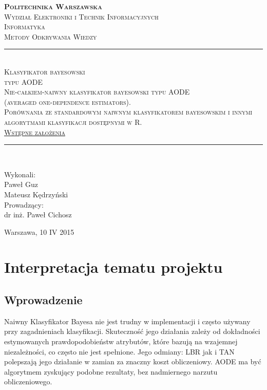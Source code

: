 \documentclass[16]{article}
\begin{document}
	\begin{titlepage}
		\begin{center}
			\vspace*{0cm}
			\textsc{\LARGE \bfseries Politechnika Warszawska}\\[1.5cm]
			\textsc{\large Wydział Elektroniki i Technik Informacyjnych}\\[0.2cm]
			\textsc{\large Informatyka}\\[1.6cm]
			\textsc{\LARGE Metody Odkrywania Wiedzy }\\[1.4cm]
			\rule{\linewidth}{0.5mm} \\ [0.8cm]
      \textsc{\Huge Klasyfikator bayesowski} \\ [0.4cm]
			\textsc{\Huge typu AODE} \\ [0.8cm]
			\textsc{\large Nie-całkiem-naiwny klasyfikator bayesowski typu AODE \\ (averaged one-dependence estimators). \\ Porównania ze standardowym naiwnym klasyfikatorem bayesowskim i innymi algorytmami klasyfikacji dostępnymi w R.} \\ [0.8cm]
			\textsc{\LARGE{\underline {Wstępne założenia}}} \\ [0.8cm]
			\rule{\linewidth}{0.5mm} \\ [1cm]
			
			\begin{flushright}
				Wykonali: \\[0.2cm]
				{\large Paweł Guz}\\[0.2cm]
				{\large Mateusz Kędrzyński}\\[0.8cm]
				Prowadzący: \\[0.2cm]
				{\large dr inż. Paweł Cichosz} \\ [0.8cm]
			\end{flushright}
			\vfill
			{\large Warszawa, 10 IV 2015}
		\end{center}
	\end{titlepage}
	
\section{Interpretacja tematu projektu}
\subsection{Wprowadzenie}
Naiwny Klasyfikator Bayesa nie jest trudny w implementacji i często używany przy zagadnieniach klasyfikacji. Skuteczność jego działania zależy od dokładności estymowanych prawdopodobieństw atrybutów, które bazują na wzajemnej niezależności, co często nie jest spełnione. Jego odmiany: LBR jak i TAN polepszają jego działanie w zamian za znaczny koszt obliczeniowy. AODE ma być algorytmem zyskujący podobne rezultaty, bez nadmiernego narzutu obliczeniowego.
\end{document}
